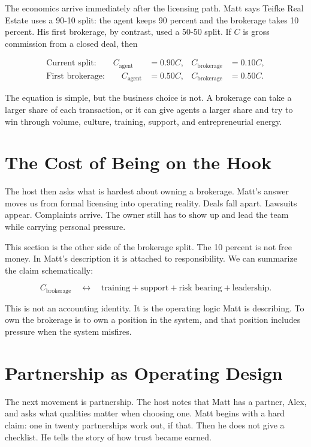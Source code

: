 The economics arrive immediately after the licensing path. Matt says Teifke Real Estate uses a 90-10 split: the agent keeps 90 percent and the brokerage takes 10 percent. His first brokerage, by contrast, used a 50-50 split. If \(C\) is gross commission from a closed deal, then

\begin{align}
\text{Current split:}\qquad
C_{\text{agent}}&=0.90C,
&
C_{\text{brokerage}}&=0.10C,\\
\text{First brokerage:}\qquad
C_{\text{agent}}&=0.50C,
&
C_{\text{brokerage}}&=0.50C.
\end{align}

The equation is simple, but the business choice is not. A brokerage can take a larger share of each transaction, or it can give agents a larger share and try to win through volume, culture, training, support, and entrepreneurial energy.

\section{The Cost of Being on the Hook}

The host then asks what is hardest about owning a brokerage. Matt's answer moves us from formal licensing into operating reality. Deals fall apart. Lawsuits appear. Complaints arrive. The owner still has to show up and lead the team while carrying personal pressure.

This section is the other side of the brokerage split. The 10 percent is not free money. In Matt's description it is attached to responsibility. We can summarize the claim schematically:

\begin{equation}
C_{\text{brokerage}}
\quad \longleftrightarrow \quad
\text{training}+\text{support}+\text{risk bearing}+\text{leadership}.
\end{equation}

This is not an accounting identity. It is the operating logic Matt is describing. To own the brokerage is to own a position in the system, and that position includes pressure when the system misfires.

\section{Partnership as Operating Design}

The next movement is partnership. The host notes that Matt has a partner, Alex, and asks what qualities matter when choosing one. Matt begins with a hard claim: one in twenty partnerships work out, if that. Then he does not give a checklist. He tells the story of how trust became earned.

